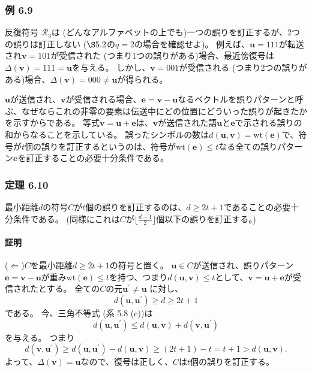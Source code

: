 \documentclass[12pt,a4paper]{article}
\begin{document}
\subsubsection*{例 6.9}

反復符号 $\mathcal{R}_3$は (どんなアルファベットの上でも)一つの誤りを訂正するが、2つの誤りは訂正しない ($\S 5.2$の$q=2$の場合を確認せよ)。
例えば、$\mathbf{u} = 111$が転送され$\mathbf{v} = 101$が受信された (つまり1つの誤りがある)場合、最近傍復号は$\Delta (\mathbf{v}) = 111 = \mathbf{u}$を与える。
しかし、$\mathbf{v} = 001$が受信される (つまり2つの誤りがある)場合、$\Delta (\mathbf{v}) = 000 \neq \mathbf{u}$が得られる。

$\mathbf{u}$が送信され、$\mathbf{v}$が受信される場合、$\mathbf{e} = \mathbf{v} - \mathbf{u}$なるベクトルを誤りパターンと呼ぶ、なぜならこれの非零の要素は伝送中にどの位置にどういった誤りが起きたかを示すからである。
等式$\mathbf{v} = \mathbf{u} + \mathbf{e}$は、$\mathbf{v}$が送信された語$\mathbf{u}$と$\mathbf{e}$で示される誤りの和からなることを示している。
誤ったシンボルの数は$d(\mathbf{u}, \mathbf{v}) = \text{wt} (\mathbf{e})$で、符号が$t$個の誤りを訂正するというのは、符号が$\text{wt} (\mathbf{e}) \leq t$なる全ての誤りパターン$\mathbf{e}$を訂正することの必要十分条件である。

\subsubsection*{定理 6.10}

最小距離$d$の符号$C$が$t$個の誤りを訂正するのは、$d \geq 2t + 1 $であることの必要十分条件である。
(同様にこれは$C$が$\lfloor \frac{d-1}{2} \rfloor$個以下の誤りを訂正する。)

\paragraph{証明}

($\Leftarrow$)$C$を最小距離$d \geq 2t + 1$の符号と置く。
$\mathbf{u} \in C$が送信され、誤りパターン$\mathbf{e} = \mathbf{v} - \mathbf{u}$が重み$\text{wt} (\mathbf{e}) \leq t$を持つ、つまり$d(\mathbf{u}, \mathbf{v}) \leq t$として、$\mathbf{v} = \mathbf{u} + \mathbf{e}$が受信されたとする。
全ての$C$の元$\mathbf{u}^\prime \neq \mathbf{u}$ に対し、
$$
d(\mathbf{u}, \mathbf{u}^\prime) \geq d \geq 2t + 1
$$
である。
今、三角不等式 (系 5.8 (c))は
$$
d(\mathbf{u}, \mathbf{u}^\prime) \leq d(\mathbf{u}, \mathbf{v}) + d(\mathbf{v}, \mathbf{u}^\prime)
$$
を与える。
つまり
$$
d(\mathbf{v}, \mathbf{u}^\prime) \geq d(\mathbf{u}, \mathbf{u}^\prime) - d(\mathbf{u}, \mathbf{v}) \geq (2t + 1) - t = t + 1 > d(\mathbf{u}, \mathbf{v}).
$$
よって、$\Delta (\mathbf{v}) = \mathbf{u}$なので、復号は正しく、$C$は$t$個の誤りを訂正する。
\end{document}
